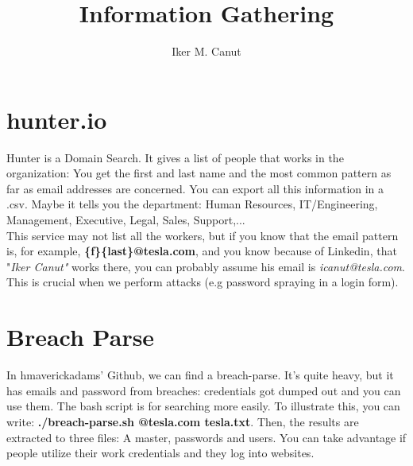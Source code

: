 \documentclass[11pt,a4paper]{article}
\author{Iker M. Canut}
\begin{document}
\title{Information Gathering}
\maketitle
\newpage

\section{hunter.io}
Hunter is a Domain Search. It gives a list of people that works in the organization: You get the first and last name and the most common pattern as far as email addresses are concerned. You can export all this information in a .csv. Maybe it tells you the department: Human Resources, IT/Engineering, Management, Executive, Legal, Sales, Support,... \\

This service may not list all the workers, but if you know that the email pattern is, for example, \textbf{\{f\}\{last\}@tesla.com}, and you know because of Linkedin, that "\textit{Iker Canut"} works there, you can probably assume his email is \textit{icanut@tesla.com}. This is crucial when we perform attacks (e.g password spraying in a login form).

\section{Breach Parse}
In hmaverickadams' Github, we can find a breach-parse. It's quite heavy, but it has emails and password from breaches: credentials got dumped out and you can use them. The bash script is for searching more easily. To illustrate this, you can write: \textbf{./breach-parse.sh @tesla.com tesla.txt}. Then, the results are extracted to three files: A master, passwords and users. You can take advantage if people utilize their work credentials and they log into websites.
\end{document}

